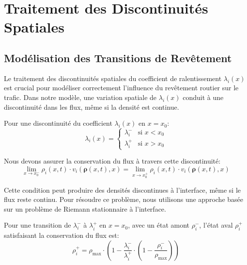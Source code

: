 \section{Traitement des Discontinuités Spatiales}
\label{sec:traitement_discontinuites}

\subsection{Modélisation des Transitions de Revêtement}
\label{subsec:transitions_revetement}

Le traitement des discontinuités spatiales du coefficient de ralentissement $\lambda_i(x)$ est crucial pour modéliser correctement l'influence du revêtement routier sur le trafic. Dans notre modèle, une variation spatiale de $\lambda_i(x)$ conduit à une discontinuité dans les flux, même si la densité est continue.

Pour une discontinuité du coefficient $\lambda_i(x)$ en $x=x_0$:
\begin{equation}
\lambda_i(x) = 
\begin{cases}
\lambda_i^- & \text{si } x < x_0 \\
\lambda_i^+ & \text{si } x > x_0
\end{cases}
\end{equation}

Nous devons assurer la conservation du flux à travers cette discontinuité:
\begin{equation}
\lim_{x \to x_0^-} \rho_i(x,t) \cdot v_i(\boldsymbol{\rho}(x,t), x) = \lim_{x \to x_0^+} \rho_i(x,t) \cdot v_i(\boldsymbol{\rho}(x,t), x)
\end{equation}

Cette condition peut produire des densités discontinues à l'interface, même si le flux reste continu. Pour résoudre ce problème, nous utilisons une approche basée sur un problème de Riemann stationnaire à l'interface.

\begin{proposition}
Pour une transition de $\lambda_i^-$ à $\lambda_i^+$ en $x = x_0$, avec un état amont $\rho_i^-$, l'état aval $\rho_i^+$ satisfaisant la conservation du flux est:
\begin{equation}
\rho_i^+ = \rho_{\max} \cdot \left(1 - \frac{\lambda_i^-}{\lambda_i^+} \cdot \left(1 - \frac{\rho_i^-}{\rho_{\max}}\right)\right)
\end{equation}
\end{proposition}

